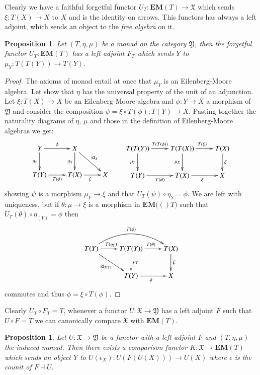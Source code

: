 \documentclass[12pt]{article}
\newtheorem{proposition}[lemma]{Proposition}
\theoremstyle{definition}
\def\T{\mathbb T}
\def\X{\mathfrak X}
\def\Y{\mathfrak Y}
\newcommand{\eim}[1]{\mathbf{EM}{(#1)}}
\numberwithin{equation}{section}
\newcommand{\id}[1]{\mathsf{id}_{#1}}
\begin{document}
Clearly we have a faithful forgetful functor $U_T:\eim{T}\rightarrow \X$ which sends $\xi:T(X)\rightarrow X$ to $X$ and is the identity on arrows. This functors has always a left adjoint, which sends an object to the \emph{free algebra} on it.

\begin{proposition} Let $(T, \eta, \mu)$ be a monad on the category $\Y$, then the forgetful functor $U_T:\eim{T}$ has a left adjoint $F_T$ which sends $Y$ to $\mu_Y:T(T(Y))\rightarrow T(Y)$.
\end{proposition}
\begin{proof} The axioms of monad entail at once that $\mu_Y$ is an Eilenberg-Moore algebra. Let show that $\eta$ has the universal property of the unit of an adjunction. Let $\xi:T(X)\rightarrow X$ be an Eilenberg-Moore algebra and $\phi:Y\rightarrow X$ a morphism of $\Y$ and consider the composition $\psi=\xi\circ T(\phi):T(Y)\rightarrow X$. Pasting together the naturality diagrams of $\eta$, $\mu$ and those in the definition of Eilenberg-Moore algebras we get:
	\[\xymatrix{Y\ar[r]^{\phi} \ar[d]_{\eta_Y} & X \ar[d]_{\eta_X} \ar[dr]^{\id{X}} & \\T(Y) \ar[r]_{T(\phi)}& T(X)\ar[r]_{\xi} & X} \qquad 
	\xymatrix{T(T(Y))\ar[r]^{T(T(\phi))} \ar[d]_{\mu_Y} & T(T(X))\ar[r]^{T(\xi)} \ar[d]_{\mu_X} & T(X)\ar[d]^{\xi}\\T(Y) \ar[r]_{T(\phi)}& T(X) \ar[r]_{\xi}& X}
	\]
showing $\psi$ is a morphism $\mu_{Y}\rightarrow \xi $ and that $U_T(\psi)\circ\eta_{Y} = \phi$. We are left with uniqueness, but if $\theta :\mu\rightarrow \xi$ is a morphism in $\eim(T)$ such that $U_T(\theta)\circ \eta_(Y)=\phi$ then
\[\xymatrix{T(Y)\ar[r]^{T(\eta_Y)} \ar[dr]_{\id{T(Y)}}\ar@/^0.75cm/[rr]^{T(\phi)}& T(T(Y)) \ar[d]^{\mu_Y}\ar[r]^{T(\theta)}& T(X)\ar[d]^{\xi}\\ & T(Y)\ar[r]_{\phi} &X} \]
commutes and thus $\phi=\xi \circ T(\phi)$.	
 \end{proof} 
Clearly $U_T\circ F_T=T$, whenever a functor $U:\X\rightarrow \Y$ has a left adjoint $F$ such that $U\circ F=T$ we can canonically compare $\X$ with $\eim{T}$.  
\begin{proposition}
	Let $U:\X\rightarrow \Y$ be a functor with a left adjoint $F$ and $(T, \eta, \mu)$ the induced monad. Then there exists a \emph{comparison functor} $K:\X\rightarrow \eim{T}$ which sends an object $Y$ to $U(\epsilon_X):U(F(U(X)))\rightarrow U(X)$
	where $\epsilon$ is the counit of $F\dashv U$.	
\end{proposition}
\end{document}
